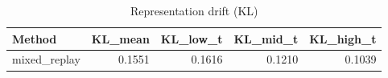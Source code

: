 \begin{table}[htbp]
\centering
\caption{Representation drift (KL)}
\label{tab:repr-drift}
\begin{tabular}{lrrrr}
\toprule
\textbf{Method} & \textbf{KL\_mean} & \textbf{KL\_low\_t} & \textbf{KL\_mid\_t} & \textbf{KL\_high\_t} \\
\midrule
mixed\_replay & 0.1551 & 0.1616 & 0.1210 & 0.1039 \\
\bottomrule
\end{tabular}
\end{table}